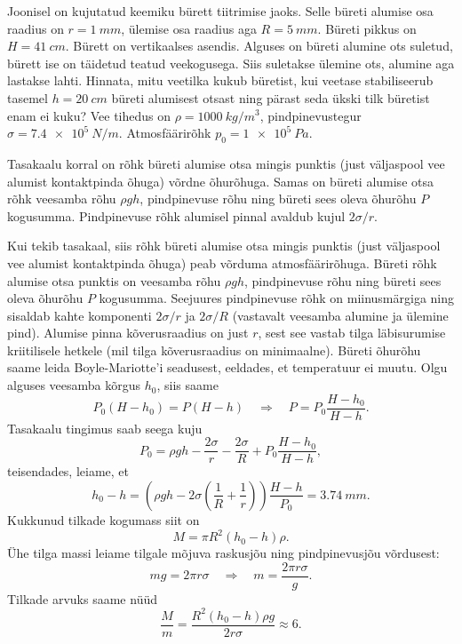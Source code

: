 Joonisel on kujutatud keemiku bürett tiitrimise jaoks. Selle büreti alumise osa raadius on $r = \SI{1}{mm}$, ülemise osa raadius aga $R = \SI{5}{mm}$. Büreti pikkus on $H = \SI{41}{cm}$. Bürett on vertikaalses asendis. Alguses on büreti alumine ots suletud, bürett ise on täidetud teatud veekogusega. Siis suletakse ülemine ots, alumine aga lastakse lahti. Hinnata, mitu veetilka kukub büretist, kui veetase stabiliseerub tasemel $h = \SI{20}{cm}$ büreti alumisest otsast ning pärast seda ükski tilk büretist enam ei kuku? Vee tihedus on $\rho = \SI{1000}{kg/m^3}$, pindpinevustegur $\sigma = \SI{7,4e5}{N/m}$. Atmosfäärirõhk $p_0 = \SI{1e5}{Pa}$.

\hint
Tasakaalu korral on rõhk büreti alumise otsa mingis punktis (just väljaspool vee alumist kontaktpinda õhuga) võrdne õhurõhuga. Samas on büreti alumise otsa rõhk veesamba rõhu $\rho g h$, pindpinevuse rõhu ning büreti sees oleva õhurõhu $P$ kogusumma. Pindpinevuse rõhk alumisel pinnal avaldub kujul $2 \sigma / r$.

\solu
Kui tekib tasakaal, siis rõhk büreti alumise otsa mingis punktis (just väljaspool vee alumist kontaktpinda õhuga) peab võrduma atmosfäärirõhuga. Büreti rõhk alumise otsa punktis on veesamba rõhu $\rho g h$, pindpinevuse rõhu ning büreti sees oleva õhurõhu $P$ kogusumma. Seejuures pindpinevuse rõhk on miinusmärgiga ning sisaldab kahte komponenti $2 \sigma / r$ ja $2 \sigma / R$ (vastavalt veesamba alumine ja ülemine pind). Alumise pinna kõverusraadius on just $r$, sest see vastab tilga läbisurumise kriitilisele hetkele (mil tilga kõverusraadius on minimaalne). Büreti õhurõhu saame leida Boyle-Mariotte'i seadusest, eeldades, et temperatuur ei muutu. Olgu alguses veesamba kõrgus $h_{0}$, siis saame
$$
P_{0}\left(H-h_{0}\right)=P(H-h) \quad \Rightarrow \quad P=P_{0} \frac{H-h_{0}}{H-h}.
$$
Tasakaalu tingimus saab seega kuju
$$
P_{0}=\rho g h-\frac{2 \sigma}{r}-\frac{2 \sigma}{R}+P_{0} \frac{H-h_{0}}{H-h},
$$
teisendades, leiame, et
$$
h_{0}-h=\left(\rho g h-2 \sigma\left(\frac{1}{R}+\frac{1}{r}\right)\right) \frac{H-h}{P_{0}}=\SI{3,74}{mm}.
$$
Kukkunud tilkade kogumass siit on
$$
M=\pi R^{2}\left(h_{0}-h\right) \rho .
$$
Ühe tilga massi leiame tilgale mõjuva raskusjõu ning pindpinevusjõu võrdusest:
$$
m g=2 \pi r \sigma \quad \Rightarrow \quad m=\frac{2 \pi r \sigma}{g}.
$$
Tilkade arvuks saame nüüd
$$
\frac{M}{m}=\frac{R^{2}\left(h_{0}-h\right) \rho g}{2 r \sigma} \approx 6.
$$
\probend